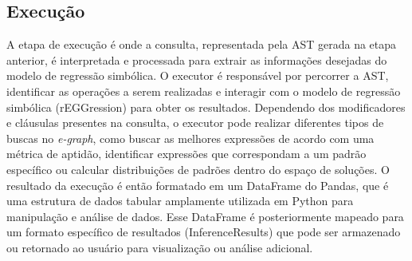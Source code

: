 \subsection{Execução}
A etapa de execução é onde a consulta, representada pela AST gerada na etapa anterior, é interpretada e processada para extrair as informações desejadas do modelo de regressão simbólica. O executor é responsável por percorrer a AST, identificar as operações a serem realizadas e interagir com o modelo de regressão simbólica (rEGGression) para obter os resultados. Dependendo dos modificadores e cláusulas presentes na consulta, o executor pode realizar diferentes tipos de buscas no \textit{e-graph}, como buscar as melhores expressões de acordo com uma métrica de aptidão, identificar expressões que correspondam a um padrão específico ou calcular distribuições de padrões dentro do espaço de soluções. O resultado da execução é então formatado em um DataFrame do Pandas, que é uma estrutura de dados tabular amplamente utilizada em Python para manipulação e análise de dados. Esse DataFrame é posteriormente mapeado para um formato específico de resultados (InferenceResults) que pode ser armazenado ou retornado ao usuário para visualização ou análise adicional.
